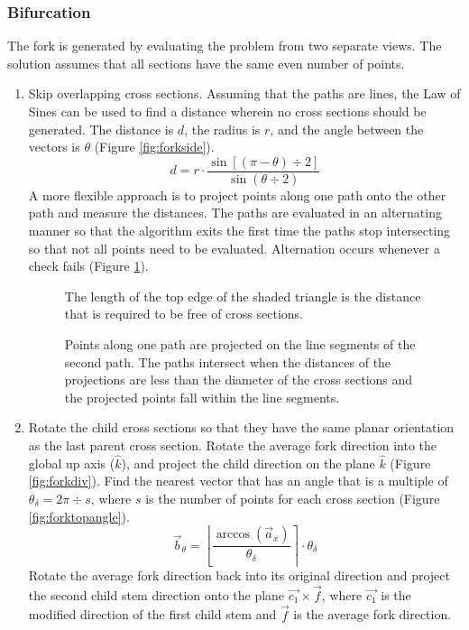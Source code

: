 \documentclass[10pt]{article}
\begin{document}
\subsubsection{Bifurcation}

The fork is generated by evaluating the problem from two separate views. The solution assumes that all sections have the same even number of points.

\begin{enumerate}
\item Skip overlapping cross sections. Assuming that the paths are lines, the Law of Sines can be used to find a distance wherein no cross sections should be generated. The distance is $ d $, the radius is $ r $, and the angle between the vectors is $ \theta $ (Figure \ref{fig:forkside}).
\[ d = r \cdot \frac{\sin[(\pi-\theta)\div2]}{\sin (\theta\div2)} \]
A more flexible approach is to project points along one path onto the other path and measure the distances. The paths are evaluated in an alternating manner so that the algorithm exits the first time the paths stop intersecting so that not all points need to be evaluated. Alternation occurs whenever a check fails (Figure \ref{fig:path}).

\begin{figure}[H]
 \begin{minipage}[b]{0.46\textwidth}
  \centering
  
  \caption{The length of the top edge of the shaded triangle is the distance that is required to be free of cross sections.} \label{fig:forkside}
 \end{minipage}
 \hfill
 \begin{minipage}[b]{0.46\textwidth}
  \centering
  
  \caption{Points along one path are projected on the line segments of the second path. The paths intersect when the distances of the projections are less than the diameter of the cross sections and the projected points fall within the line segments.} \label{fig:path}
 \end{minipage}
\end{figure}

\item Rotate the child cross sections so that they have the same planar orientation as the last parent cross section. Rotate the average fork direction into the global up axis ($ \hat{k} $), and project the child direction on the plane $ \hat{k} $ (Figure \ref{fig:forkdiv}). Find the nearest vector that has an angle that is a multiple of $ \theta_{\delta} = 2 \pi \div s $, where $ s $ is the number of points for each cross section (Figure \ref{fig:forktopangle}).
\[ \vec{b}_{\theta} = \left \lfloor \frac{\arccos(\vec{a}_x)}{\theta_{\delta}} \right\rceil \cdot \theta_{\delta} \]
Rotate the average fork direction back into its original direction and project the second child stem direction onto the plane $ \vec{c_1} \times \vec{f} $, where $ \vec{c_1} $ is the modified direction of the first child stem and $ \vec{f} $ is the average fork direction.


\end{enumerate}
\end{document}
